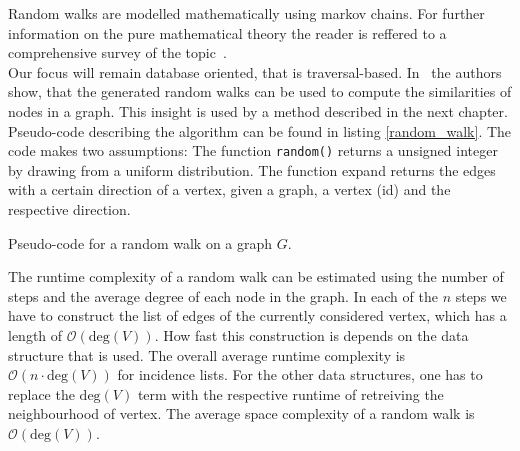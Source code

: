             Random walks are modelled mathematically using markov chains.            
            For further information on the pure mathematical theory the reader is reffered to a comprehensive survey of the topic~\autocite{lovasz1993random}. \\
            
            Our focus will remain database oriented, that is traversal-based.
            In~\autocite{fouss2007random} the authors show, that the generated random walks can be used to compute the similarities of nodes in a graph. 
            This insight is used by a method described in the next chapter. \\
            
            Pseudo-code describing the algorithm can be found in listing \ref{random_walk}. 
            The code makes two assumptions: The function \texttt{random()} returns a unsigned integer by drawing from a uniform distribution. 
            The function expand returns the edges with a certain direction of a vertex, given a graph, a vertex (id) and the respective direction. \\
            
            \begin{algorithm}[htp]
                \hrulealg
            \caption{Pseudo-code for a random walk on a graph $G$.}\label{random_walk}
            \end{algorithm}
            
            The runtime complexity of a random walk can be estimated using the number of steps and the average degree of each node in the graph. 
            In each of the $n$ steps we have to construct the list of edges of the currently considered vertex, which has a length of $\mathcal{O}(\text{deg}(V))$. 
            How fast this construction is depends on the data structure that is used. 
            The overall average runtime complexity is $\mathcal{O}(n \cdot \text{deg}(V))$ for incidence lists. 
            For the other data structures, one has to replace the $\text{deg}(V)$ term with the respective runtime of retreiving the neighbourhood of vertex. 
            The average space complexity of a random walk is $\mathcal{O}(\text{deg}(V))$. \\

